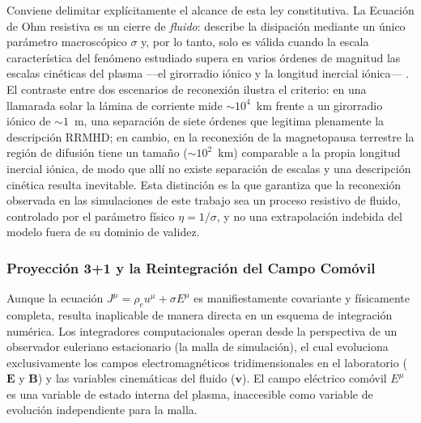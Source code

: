 \primerparrafo Conviene delimitar explícitamente el alcance de esta ley constitutiva. La Ecuación de Ohm resistiva es un cierre de \emph{fluido}: describe la disipación mediante un único parámetro macroscópico $\sigma$ y, por lo tanto, solo es válida cuando la escala característica del fenómeno estudiado supera en varios órdenes de magnitud las escalas cinéticas del plasma ---el girorradio iónico y la longitud inercial iónica--- \parencite{yamada-2010}. El contraste entre dos escenarios de reconexión ilustra el criterio: en una llamarada solar la lámina de corriente mide $\sim 10^4$~km frente a un girorradio iónico de $\sim 1$~m, una separación de siete órdenes que legitima plenamente la descripción RRMHD; en cambio, en la reconexión de la magnetopausa terrestre la región de difusión tiene un tamaño ($\sim 10^2$~km) comparable a la propia longitud inercial iónica, de modo que allí no existe separación de escalas y una descripción cinética resulta inevitable. Esta distinción es la que garantiza que la reconexión observada en las simulaciones de este trabajo sea un proceso resistivo de fluido, controlado por el parámetro físico $\eta = 1/\sigma$, y no una extrapolación indebida del modelo fuera de su dominio de validez.

\subsubsection{Proyección 3+1 y la Reintegración del Campo Comóvil}

\primerparrafo Aunque la ecuación $J^\mu = \rho_e u^\mu + \sigma E^\mu$ es manifiestamente covariante y físicamente completa, resulta inaplicable de manera directa en un esquema de integración numérica. Los integradores computacionales operan desde la perspectiva de un observador euleriano estacionario (la malla de simulación), el cual evoluciona exclusivamente los campos electromagnéticos tridimensionales en el laboratorio ($\mathbf{E}$ y $\mathbf{B}$) y las variables cinemáticas del fluido ($\mathbf{v}$). El campo eléctrico comóvil $E^\mu$ es una variable de estado interna del plasma, inaccesible como variable de evolución independiente para la malla. 

